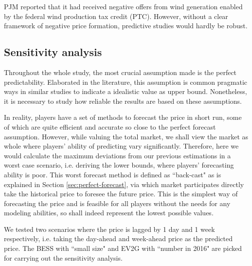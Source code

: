PJM reported that it had received negative offers from wind generation enabled by the federal wind production tax credit (PTC)\cite{PJM_price_limit_1}. However, without a clear framework of negative price formation, predictive studies would hardly be robust. 

\subsection{Sensitivity analysis}
\label{sec:sensitivity}
Throughout the whole study, the most crucial assumption made is the perfect predictability. Elaborated in the literature, this assumption is common pragmatic ways in similar studies to indicate a idealistic value as upper bound. Nonetheless, it is necessary to study how reliable the results are based on these assumptions. 

In reality, players have a set of methods to forecast the price in short run, some of which are quite efficient and accurate \cite{Weron2014} so close to the perfect forecast assumption. However, while valuing the total market, we shall view the market as whole where players' ability of predicting vary significantly. Therefore, here we would calculate the maximum deviations from our previous estimations in a worst case scenario, i.e. deriving the lower bounds, where players' forecasting ability is poor. This worst forecast method is defined as ``back-cast" as is explained in Section \ref{sec:perfect-forecast}, via which market participates directly take the historical price to foresee the future price. This is the simplest way of forecasting the price and is feasible for all players without the needs for any modeling abilities, so shall indeed represent the lowest possible values.

We tested two scenarios where the price is lagged by 1 day and 1 week respectively, i.e. taking the day-ahead and week-ahead price as the predicted price. The BESS with ``small size" and EV2G with ``number in 2016" are picked for carrying out the sensitivity analysis. 

